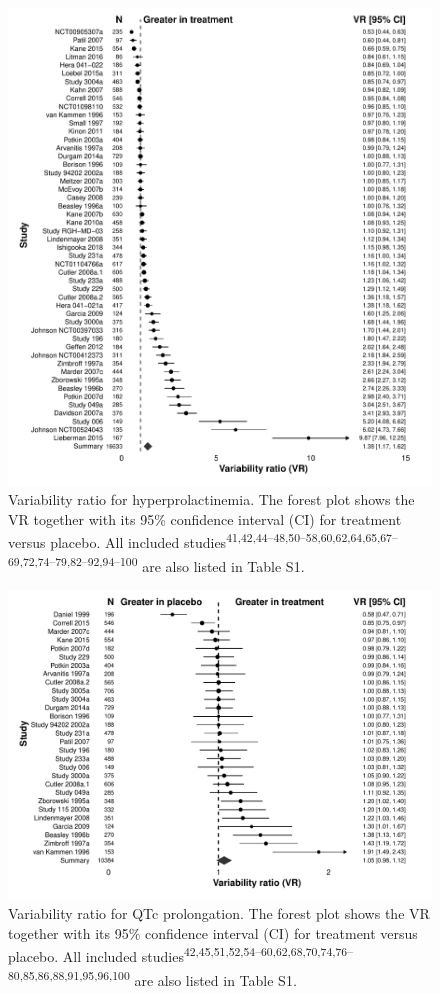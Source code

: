 \documentclass[
  9pt,
  english,
  ,jou,floatsintext]{apa6}
\begin{document}
\begin{figure}
\centering
\includegraphics{../output/figures/prolactinsd_fig1.pdf}
\caption{\label{fig:fig3}Variability ratio for hyperprolactinemia. The forest
plot shows the VR together with its 95\% confidence interval (CI) for
treatment versus placebo. All included studies\textsuperscript{41,42,44--48,50--58,60,62,64,65,67--69,72,74--79,82--92,94--100}
are also listed in Table S1.}
\end{figure}

\begin{figure}
\centering
\includegraphics{../output/figures/qtcsd_fig1.pdf}
\caption{\label{fig:fig5}Variability ratio for QTc prolongation. The forest
plot shows the VR together with its 95\% confidence interval (CI) for
treatment versus placebo. All included studies\textsuperscript{42,45,51,52,54--60,62,68,70,74,76--80,85,86,88,91,95,96,100}
are also listed in Table S1.}
\end{figure}
\end{document}
